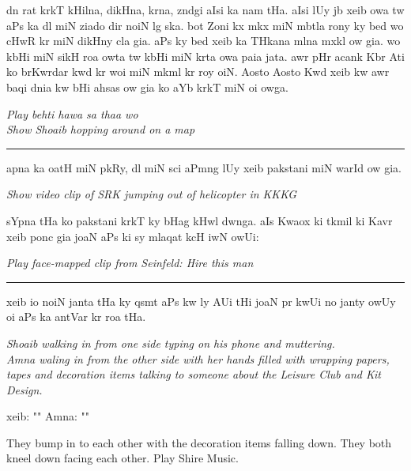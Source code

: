 \documentclass{article}
\begin{document}
	dn rat krkT kHilna, dikHna,  krna, zndgi aIsi ka nam tHa.
	aIsi lUy jb xeib  owa tw aPs ka dl  miN ziado dir noiN lg ska.
	bot Zoni kx mkx miN mbtla rony ky bed wo  cHwR kr  miN  dikHny cla gia.
	aPs ky bed xeib ka THkana mlna mxkl ow gia.
	wo kbHi  miN  sikH roa owta tw kbHi  miN  krta owa paia jata.
	awr pHr acank Kbr Ati ko brKwrdar  kwd kr woi  miN mkml kr roy oiN. 
	Aosto Aosto Kwd xeib kw awr baqi dnia kw bHi ahsas ow gia ko aYb  krkT miN oi owga.

\begin{enpara}
	\itshape
	Play behti hawa sa thaa wo\\
	Show Shoaib hopping around on a map
\end{enpara}

\rule{\textwidth}{1pt}

	apna  ka  oatH miN pkRy, dl miN sci aPmng lUy xeib pakstani miN warId ow gia.

\begin{enpara}
	\itshape
	Show video clip of SRK jumping out of helicopter in KKKG
\end{enpara}
\vspace{0.5\baselineskip}

	sYpna tHa ko pakstani krkT ky bHag kHwl dwnga.
	aIs Kwaox ki tkmil ki Kavr xeib  ponc gia joaN aPs ki  sy mlaqat kcH iwN owUi: 

\begin{enpara}
	\itshape
	Play face-mapped clip from Seinfeld: Hire this man
\end{enpara}



\rule{\textwidth}{1pt}

	xeib io noiN janta tHa ky qsmt aPs kw  ly AUi tHi joaN pr kwUi no janty owUy oi aPs ka antVar kr roa tHa.

\begin{enpara}
	\itshape
	Shoaib walking in from one side typing on his phone and muttering.\\
	Amna waling in from the other side with her hands filled with wrapping papers, tapes and decoration items talking to someone about the Leisure Club and Kit Design.
\end{enpara}

	xeib: ""
	Amna: ""

\begin{enpara}
	They bump in to each other with the decoration items falling down.
	They both kneel down facing each other.
	Play Shire Music.
\end{enpara}
\end{document}
